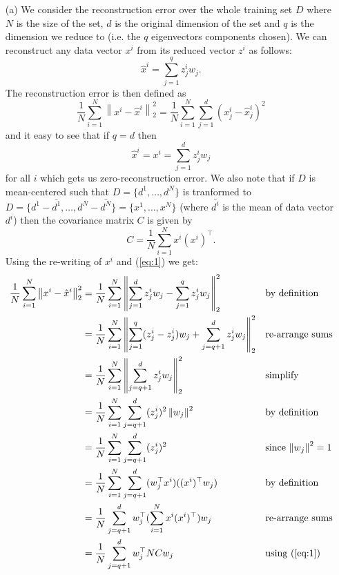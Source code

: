 \documentclass [10pt]{article}
\newcommand{\norm}[1]{\left\lVert#1\right\rVert}
\begin{document}
\begin{enumerate}
	\begin{enumerate}
		\item[(a)]We consider the reconstruction error over the whole training set $D$ where $N$ is the size of the set, $d$ is the original dimension of the set and $q$ is the dimension we reduce to (i.e. the $q$ eigenvectors components chosen). We can reconstruct any data vector $x^{i}$ from its reduced vector $z^{i}$ as follows:$$\hat{x}^{i}=\sum_{j=1}^{q}z^{i}_{j}w_{j}.$$The reconstruction error is then defined as$$\frac{1}{N}\sum_{i=1}^{N}\norm{x^{i}-\hat{x}^{i}}_{2}^{2}=\frac{1}{N}\sum_{i=1}^{N}\sum_{j=1}^{d}(x_{j}^{i}-\hat{x}_{j}^{i})^{2}$$and it easy to see that if $q=d$ then$$\hat{x}^{i}=x^{i}=\sum_{j=1}^{d}z^{i}_{j}w_{j}$$for all $i$ which gets us zero-reconstruction error. We also note that if $D$ is mean-centered such that $D=\{d^{1},\dots,d^{N}\}$ is tranformed to $D=\{d^{1}-\bar{d^{1}},\dots,d^{N}-\bar{d^{N}}\}=\{x^{1},\dots,x^{N}\}$ (where $\bar{d^{i}}$ is the mean of data vector $d^{i}$) then the covariance matrix $C$ is given by
		\begin{equation}\label{eq:1}
			C = \frac{1}{N}\sum_{i=1}^{N}x^{i}(x^{i})^{\top}.
		\end{equation}
		Using the re-writing of $x^{i}$ and (\ref{eq:1}) we get:
		\begin{align}
			\frac{1}{N}\sum_{i=1}^{N}\norm{x^{i}-\hat{x}^{i}}_{2}^{2}&=\frac{1}{N}\sum_{i=1}^{N}\norm{\sum_{j=1}^{d}z^{i}_{j}w_{j}-\sum_{j=1}^{q}z^{i}_{j}w_{j}}_{2}^{2}&&\text{by definition}\nonumber\\
			&=\frac{1}{N}\sum_{i=1}^{N}\norm{\sum_{j=1}^{q}(z^{i}_{j}-z^{i}_{j})w_{j}+\sum_{j=q+1}^{d}z^{i}_{j}w_{j}}_{2}^{2}&&\text{re-arrange sums}\nonumber\\
			&=\frac{1}{N}\sum_{i=1}^{N}\norm{\sum_{j=q+1}^{d}z^{i}_{j}w_{j}}_{2}^{2}&&\text{simplify}\nonumber\\
			&=\frac{1}{N}\sum_{i=1}^{N}\sum_{j=q+1}^{d}(z^{i}_{j})^{2}\norm{w_j}^{2}&&\text{by definition}\nonumber\\
			&=\frac{1}{N}\sum_{i=1}^{N}\sum_{j=q+1}^{d}(z^{i}_{j})^{2}&&\text{since $\norm{w_{j}}^{2}=1$}\nonumber\\
			&=\frac{1}{N}\sum_{i=1}^{N}\sum_{j=q+1}^{d}(w_{j}^{\top}x^{i})((x^{i})^{\top}w_{j})&&\text{by definition}\nonumber\\
			&=\frac{1}{N}\sum_{j=q+1}^{d}w_{j}^{\top}(\sum_{i=1}^{N}x^{i}(x^{i})^{\top})w_{j}&&\text{re-arrange sums}\nonumber\\
			&=\frac{1}{N}\sum_{j=q+1}^{d}w_{j}^{\top}NCw_{j}&&\text{using (\ref{eq:1})}\nonumber\\

\end{align}
\end{enumerate}
\end{enumerate}
\end{document}
